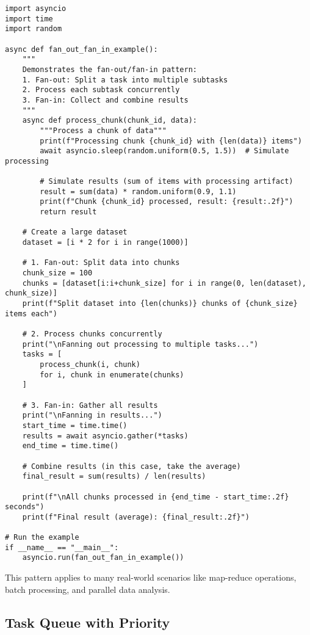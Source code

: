 \documentclass[12pt,letterpaper]{article}
\newenvironment{macterminal}{%
    \begin{mdframed}[
        linecolor=terminalFrame,
        backgroundcolor=terminalBg,
        roundcorner=5pt,
        skipabove=10pt,
        skipbelow=10pt,
        linewidth=1pt,
        innertopmargin=10pt, %
        frametitle={%
            \tikz[baseline=(current bounding box.east), outer sep=0pt]{
                \fill[red!80!black] (0,0) circle (5pt);
                \fill[yellow!80!black] (0.7,0) circle (5pt);
                \fill[green!70!black] (1.4,0) circle (5pt);
            }
        },
        frametitlealignment=\raggedright, %
        frametitleaboveskip=8pt, %
        frametitlebelowskip=0pt, %
    ]
}{%
    \end{mdframed}%
}
\begin{document}
\begin{macterminal}
\begin{lstlisting}
import asyncio
import time
import random

async def fan_out_fan_in_example():
    """
    Demonstrates the fan-out/fan-in pattern:
    1. Fan-out: Split a task into multiple subtasks
    2. Process each subtask concurrently
    3. Fan-in: Collect and combine results
    """
    async def process_chunk(chunk_id, data):
        """Process a chunk of data"""
        print(f"Processing chunk {chunk_id} with {len(data)} items")
        await asyncio.sleep(random.uniform(0.5, 1.5))  # Simulate processing
        
        # Simulate results (sum of items with processing artifact)
        result = sum(data) * random.uniform(0.9, 1.1)
        print(f"Chunk {chunk_id} processed, result: {result:.2f}")
        return result
    
    # Create a large dataset
    dataset = [i * 2 for i in range(1000)]
    
    # 1. Fan-out: Split data into chunks
    chunk_size = 100
    chunks = [dataset[i:i+chunk_size] for i in range(0, len(dataset), chunk_size)]
    print(f"Split dataset into {len(chunks)} chunks of {chunk_size} items each")
    
    # 2. Process chunks concurrently
    print("\nFanning out processing to multiple tasks...")
    tasks = [
        process_chunk(i, chunk)
        for i, chunk in enumerate(chunks)
    ]
    
    # 3. Fan-in: Gather all results
    print("\nFanning in results...")
    start_time = time.time()
    results = await asyncio.gather(*tasks)
    end_time = time.time()
    
    # Combine results (in this case, take the average)
    final_result = sum(results) / len(results)
    
    print(f"\nAll chunks processed in {end_time - start_time:.2f} seconds")
    print(f"Final result (average): {final_result:.2f}")

# Run the example
if __name__ == "__main__":
    asyncio.run(fan_out_fan_in_example())
\end{lstlisting}
\end{macterminal}

This pattern applies to many real-world scenarios like map-reduce operations, batch processing, and parallel data analysis.

\subsection{Task Queue with Priority}
\end{document}
